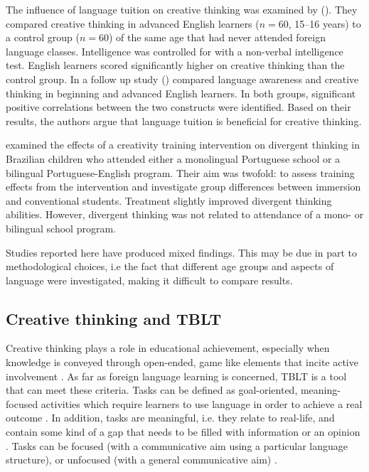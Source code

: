 \documentclass[output=paper]{langsci/langscibook}
\begin{document}
The influence of language tuition on creative thinking was examined by (\citealt{GhonsoolyShowqi2012}). They compared creative thinking in advanced English learners ($n=60$, 15--16 years) to a control group ($n=60$) of the same age that had never attended foreign language classes. Intelligence was controlled for with a non-verbal intelligence test. English learners scored significantly higher on creative thinking than the control group. In a follow up study (\citealt{ShowqiGhonsooly2015}) compared language awareness and creative thinking in beginning and advanced English learners. In both groups, significant positive correlations between the two constructs were identified. Based on their results, the authors argue that language tuition is beneficial for creative thinking.

\citet{FleithEtAl2002} examined the effects of a creativity training intervention on divergent thinking in Brazilian children who attended either a monolingual Portuguese school or a bilingual Portuguese-English program. Their aim was twofold: to assess training effects from the intervention and investigate group differences between immersion and conventional students. Treatment slightly improved divergent thinking abilities. However, divergent thinking was not related to attendance of a mono- or bilingual school program. 

Studies reported here have produced mixed findings. This may be due in part to methodological choices, i.e the fact that different age groups and aspects of language were investigated, making it difficult to compare results. 

\subsection{Creative thinking and TBLT}\label{sec:06:2.3}
\begin{sloppypar}
Creative thinking plays a role in educational achievement, especially when knowledge is conveyed through open-ended, game like elements that incite active involvement \citep{Runco2004}. As far as foreign language learning is concerned, TBLT is a tool that can meet these criteria. Tasks can be defined as goal-oriented, meaning-focused activities which require learners to use language in order to achieve a real outcome \citep[2]{Willis1996}. In addition, tasks are meaningful, i.e. they relate to real-life, and contain some kind of a gap that needs to be filled with information or an opinion \citep{Ellis2017}. Tasks can be focused (with a communicative aim using a particular language structure), or unfocused (with a general communicative aim) \citep{Ellis2009}. 
\end{sloppypar}
\end{document}
